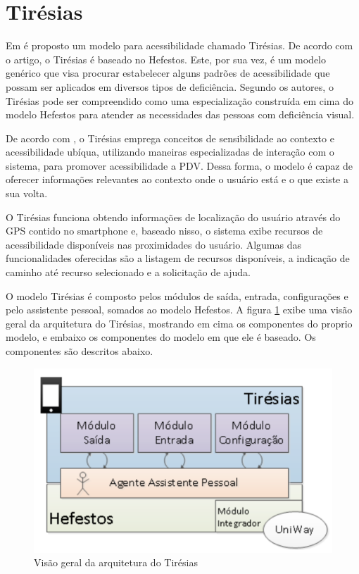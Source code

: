 \documentclass[english,brazilian]{UNISINOSmonografia}
\begin{document}
	\section{Tirésias}
Em  é proposto um modelo para acessibilidade chamado Tirésias. De acordo com o artigo, o Tirésias é baseado no Hefestos. Este, por sua vez, é um modelo genérico que visa procurar estabelecer alguns padrões de acessibilidade que possam ser aplicados em diversos tipos de deficiência. Segundo os autores, o Tirésias pode ser compreendido como uma especialização construída em cima do modelo Hefestos para atender as necessidades das pessoas com deficiência visual. 

De acordo com , o Tirésias emprega conceitos de sensibilidade ao contexto e acessibilidade ubíqua, utilizando maneiras especializadas de interação com o sistema, para promover acessibilidade a PDV. Dessa forma, o modelo é capaz de oferecer informações relevantes ao contexto onde o usuário está e o que existe a sua volta.

O Tirésias funciona obtendo informações de localização do usuário através do GPS contido no smartphone e, baseado nisso, o sistema exibe recursos de acessibilidade disponíveis nas proximidades do usuário. Algumas das funcionalidades oferecidas são a listagem de recursos disponíveis, a indicação de caminho até recurso selecionado e a solicitação de ajuda.

O modelo Tirésias é composto pelos módulos de saída, entrada, configurações e pelo assistente pessoal, somados ao modelo Hefestos. A figura \ref{fig:visaoGeralTiresias} exibe uma visão geral da arquitetura do Tirésias, mostrando em cima os componentes do proprio modelo, e embaixo os componentes do modelo em que ele é baseado. Os componentes são descritos abaixo.

\begin{figure}
	\caption{Visão geral da arquitetura do Tirésias}
	\label{fig:visaoGeralTiresias}
	\centering%
	\begin{minipage}{.6\textwidth}
		\includegraphics[width=\textwidth]{imgs/tiresiasArquitetura}
		\end{minipage}
\end{figure}
\end{document}
